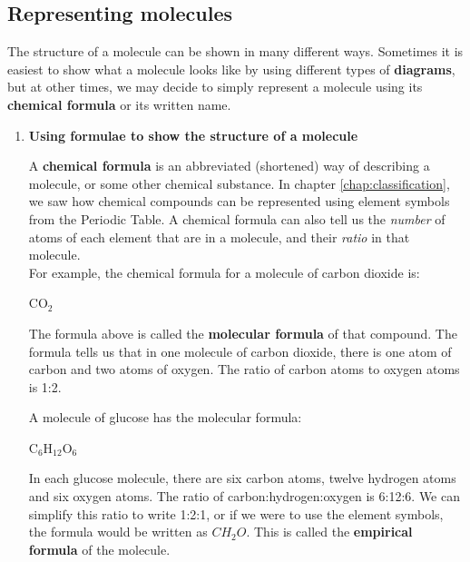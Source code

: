 \subsection{Representing molecules}

The structure of a molecule can be shown in many different ways. Sometimes it is easiest to show what a molecule looks like by using different types of \textbf{diagrams}, but at other times, we may decide to simply represent a molecule using its \textbf{chemical formula} or its written name.

\begin{enumerate}
\item{\textbf{Using formulae to show the structure of a molecule}}

A \textbf{chemical formula} is an abbreviated (shortened) way of describing a molecule, or some other chemical substance. In chapter \ref{chap:classification}, we saw how chemical compounds can be represented using {element symbols} from the Periodic Table. A chemical formula can also tell us the \textit{number} of atoms of each element that are in a molecule, and their \textit{ratio} in that molecule.\\

For example, the chemical formula for a molecule of carbon dioxide is:

\begin{center}
CO$_{2}$
\end{center}

The formula above is called the \textbf{molecular formula} of that compound. The formula tells us that in one molecule of carbon dioxide, there is one atom of carbon and two atoms of oxygen. The ratio of carbon atoms to oxygen atoms is 1:2.\\


A molecule of glucose has the molecular formula:

\begin{center}
C$_{6}$H$_{12}$O$_{6}$
\end{center}

In each glucose molecule, there are six carbon atoms, twelve hydrogen atoms and six oxygen atoms. The ratio of carbon:hydrogen:oxygen is 6:12:6. We can simplify this ratio to write 1:2:1, or if we were to use the element symbols, the formula would be written as $CH_{2}O$. This is called the \textbf{empirical formula} of the molecule.\\


\end{enumerate}

